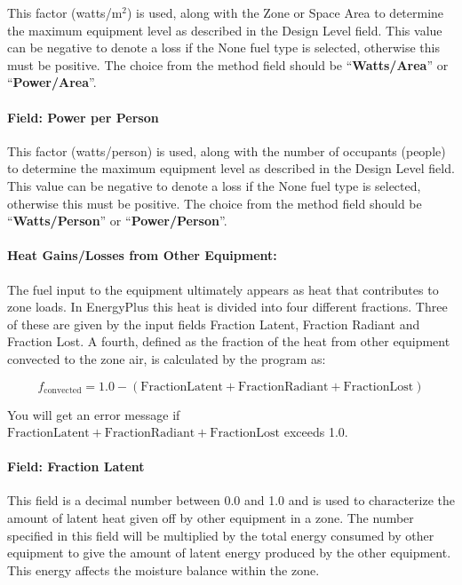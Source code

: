 This factor (watts/m\(^{2}\)) is used, along with the Zone or Space Area to determine the maximum equipment level as described in the Design Level field. This value can be negative to denote a loss if the None fuel type is selected, otherwise this must be positive. The choice from the method field should be ``\textbf{Watts/Area}'' or ``\textbf{Power/Area}''.

\paragraph{Field: Power per Person}\label{field-power-per-person-3}

This factor (watts/person) is used, along with the number of occupants (people) to determine the maximum equipment level as described in the Design Level field. This value can be negative to denote a loss if the None fuel type is selected, otherwise this must be positive. The choice from the method field should be ``\textbf{Watts/Person}'' or ``\textbf{Power/Person}''.

\paragraph{Heat Gains/Losses from Other Equipment:}\label{heat-gainslosses-from-other-equipment}

The fuel input to the equipment ultimately appears as heat that contributes to zone loads. In EnergyPlus this heat is divided into four different fractions. Three of these are given by the input fields Fraction Latent, Fraction Radiant and Fraction Lost. A fourth, defined as the fraction of the heat from other equipment convected to the zone air, is calculated by the program as:

\begin{equation}
  f_{\mathrm{convected}} = 1.0 - (\mathrm{Fraction Latent} + \mathrm{Fraction Radiant} + \mathrm{Fraction Lost})
\end{equation}

You will get an error message if \(\mathrm{Fraction Latent} + \mathrm{Fraction Radiant} + \mathrm{Fraction Lost}\) exceeds 1.0.

\paragraph{Field: Fraction Latent}\label{field-fraction-latent-4}

This field is a decimal number between 0.0 and 1.0 and is used to characterize the amount of latent heat given off by other equipment in a zone. The number specified in this field will be multiplied by the total energy consumed by other equipment to give the amount of latent energy produced by the other equipment. This energy affects the moisture balance within the zone.

